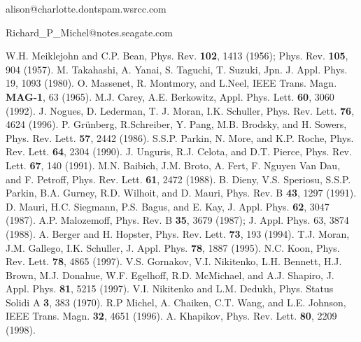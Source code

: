{\newpage\clearpage
{}%
\begin{references} alison@charlotte.dontspam.wsrcc.com

  Richard\_P\_Michel@notes.seagate.com

 W.H. Meiklejohn and C.P. Bean, Phys. Rev. {\bf 102},
1413 (1956); Phys. Rev.  {\bf 105}, 904 (1957). 
 M. Takahashi, A. Yanai, S. Taguchi, T. Suzuki,
Jpn. J. Appl. Phys. 19, 1093 (1980). 
 O. Massenet, R. Montmory, and L.Neel, IEEE
Trans. Magn. {\bf MAG-1}, 63 (1965). 
 M.J. Carey, A.E. Berkowitz, Appl. Phys. Lett. {\bf
60}, 3060 (1992). 
 J. Nogues, D. Lederman, T. J. Moran, I.K. Schuller,
Phys. Rev. Lett.  {\bf 76}, 4624 (1996). 
 P. Gr\"unberg, R.Schreiber, Y. Pang, M.B. Brodsky,
 and H. Sowers, Phys.  Rev. Lett. {\bf 57}, 2442 (1986). 
 S.S.P. Parkin, N. More, and K.P. Roche,
Phys. Rev. Lett. {\bf 64}, 2304 (1990). 
 J. Unguris, R.J. Celota, and D.T. Pierce,
Phys. Rev. Lett. {\bf 67}, 140 (1991). 
 M.N. Baibich, J.M. Broto, A. Fert, F. Nguyen Van
Dau, and F. Petroff, Phys. Rev. Lett. {\bf 61}, 2472 (1988). 
 B. Dieny, V.S. Speriosu, S.S.P. Parkin, B.A. Gurney,
 R.D. Wilhoit, and D. Mauri, Phys.  Rev. B {\bf 43}, 1297 (1991). 
 D. Mauri, H.C. Siegmann, P.S. Bagus, and E. Kay,
J. Appl. Phys. {\bf 62}, 3047 (1987). 
 A.P. Malozemoff, Phys. Rev. B {\bf 35}, 3679
(1987); J. Appl. Phys. 63, 3874 (1988). 
 A. Berger and H. Hopster, Phys. Rev. Lett. {\bf 73},
193 (1994). 
 T.J. Moran, J.M. Gallego, I.K. Schuller,
J. Appl. Phys. {\bf 78}, 1887 (1995). 
 N.C. Koon, Phys. Rev. Lett. {\bf 78}, 4865 (1997). 
 V.S. Gornakov, V.I. Nikitenko, L.H. Bennett,
H.J. Brown, M.J. Donahue, W.F. Egelhoff, R.D. McMichael, and
A.J. Shapiro, J. Appl. Phys. {\bf 81}, 5215 (1997). 
 V.I. Nikitenko and L.M. Dedukh, Phys. Status Solidi A {\bf
3}, 383 (1970). 
 R.P Michel, A. Chaiken, C.T. Wang, and L.E. Johnson,
IEEE Trans. Magn.  {\bf 32}, 4651 (1996). 
 A. Khapikov, Phys. Rev. Lett. {\bf 80}, 2209
(1998).

\end{references}%
\lthtmlfigureZ
\hfill\lthtmlcheckvsize\clearpage}

{\newpage\clearpage
{}%
\begin{figure}\end{figure}%
\lthtmlfigureZ
\hfill\lthtmlcheckvsize\clearpage}



